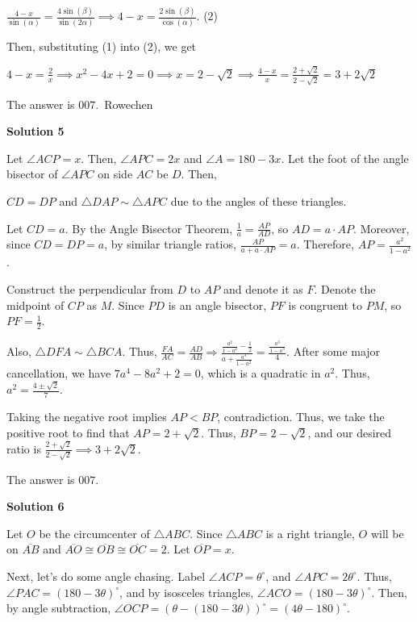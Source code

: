 \begin{enumerate}
 $\frac{4-x}{\sin(\alpha)}=\frac{4\sin(\beta)}{\sin(2\alpha)} \implies 4-x=\frac{2\sin(\beta)}{\cos(\alpha)}$. (2)

 Then, substituting (1) into (2), we get

 $4-x=\frac{2}{x} \implies x^2-4x+2=0 \implies x=2-\sqrt{2} \implies \frac{4-x}{x}=\frac{2+\sqrt{2}}{2-\sqrt{2}}=3+2\sqrt{2}$

 The answer is $\boxed{007}$.~Rowechen

 



\textbf{Solution 5}

Let $\angle{ACP}=x$. Then, $\angle{APC}=2x$ and $\angle{A}=180-3x$. Let the foot of the angle bisector of $\angle{APC}$ on side $AC$ be $D$. Then,

 $CD=DP$ and $\triangle{DAP}\sim{\triangle{APC}}$ due to the angles of these triangles.

 Let $CD=a$. By the Angle Bisector Theorem, $\frac{1}{a}=\frac{AP}{AD}$, so $AD=a\cdot{AP}$. Moreover, since $CD=DP=a$, by similar triangle ratios, $\frac{AP}{a+a\cdot{AP}}=a$. Therefore, $AP = \frac{a^2}{1-a^2}$. 

 Construct the perpendicular from $D$ to $AP$ and denote it as $F$. Denote the midpoint of $CP$ as $M$. Since $PD$ is an angle bisector, $PF$ is congruent to $PM$, so $PF=\frac{1}{2}$. 

 Also, $\triangle{DFA}\sim{\triangle{BCA}}$. Thus, $\frac{FA}{AC}=\frac{AD}{AB}\Longrightarrow\frac{\frac{a^2}{1-a^2}-\frac{1}{2}}{a+\frac{a^3}{1-a^2}}=\frac{\frac{a^3}{1-a^3}}{4}$. After some major cancellation, we have $7a^4-8a^2+2=0$, which is a quadratic in $a^2$. Thus, $a^2 = \frac{4\pm\sqrt{2}}{7}$. 

 Taking the negative root implies $AP<BP$, contradiction. Thus, we take the positive root to find that $AP=2+\sqrt{2}$. Thus, $BP=2-\sqrt{2}$, and our desired ratio is $\frac{2+\sqrt{2}}{2-\sqrt{2}}\implies{3+2\sqrt{2}}$.

 The answer is $\boxed{007}$.

 



\textbf{Solution 6}

Let $O$ be the circumcenter of $\triangle ABC$. Since $\triangle ABC$ is a right triangle, $O$ will be on $\overline{AB}$ and $\overline{AO} \cong \overline{OB} \cong \overline{OC} = 2$. Let $\overline{OP} = x$.

 Next, let's do some angle chasing. Label $\angle ACP = \theta^{\circ}$, and $\angle APC = 2\theta^{\circ}$. Thus, $\angle PAC = (180-3\theta)^{\circ}$, and by isosceles triangles,  $\angle ACO = (180-3\theta)^{\circ}$. Then, by angle subtraction, $\angle OCP = (\theta - (180-3\theta))^{\circ} = (4\theta - 180)^{\circ}$.


\end{enumerate}
